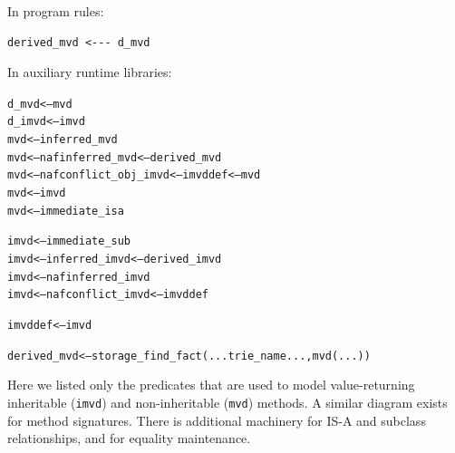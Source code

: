 \documentclass[11pt]{article}
\newcommand{\SILKNAF}{{{\tt naf}}\xspace}
\begin{document}
\noindent
In program rules:
\begin{verbatim}
derived_mvd <--- d_mvd  
\end{verbatim}
\noindent
In auxiliary runtime libraries:
\begin{alltt}
d_mvd  <---  mvd
d_imvd <--- imvd
          mvd <---      inferred_mvd
          mvd <--- \SILKNAF inferred_mvd      <--- derived_mvd
          mvd <--- \SILKNAF conflict_obj_imvd                     <--- imvddef <--- mvd
          mvd <---      imvd
          mvd <---      immediate_isa

         imvd <---      immediate_sub
         imvd <---      inferred_imvd     <--- derived_imvd
         imvd <--- \SILKNAF inferred_imvd
         imvd <--- \SILKNAF conflict_imvd                         <--- imvddef

      imvddef <---      imvd

  derived_mvd <--- storage_find_fact(...trie_name..., mvd(...))
\end{alltt}
Here we listed only the predicates that are used to model value-returning
inheritable ({\tt imvd}) and non-inheritable ({\tt mvd}) methods.  A similar
diagram exists for
method signatures. There is additional machinery for
IS-A and subclass relationships, and for equality maintenance.
\end{document}
